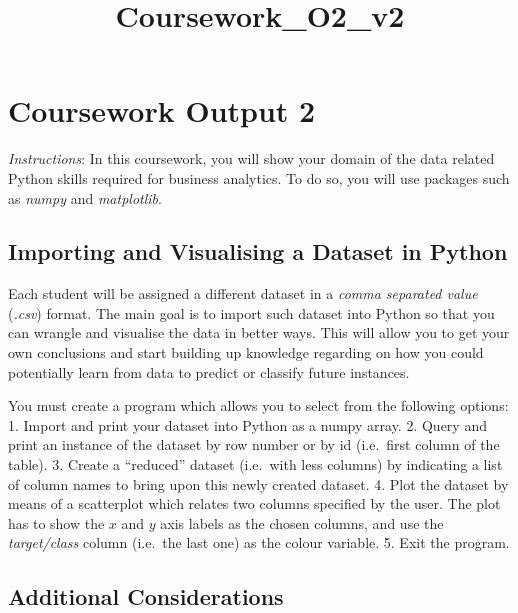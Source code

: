 \documentclass[11pt]{article}
\title{Coursework\_O2\_v2}
\begin{document}
    
    
    \maketitle
    
    

    
    \hypertarget{coursework-output-2}{%
\section{Coursework Output 2}\label{coursework-output-2}}

\emph{Instructions}: In this coursework, you will show your domain of
the data related Python skills required for business analytics. To do
so, you will use packages such as \emph{numpy} and \emph{matplotlib}.

    \hypertarget{importing-and-visualising-a-dataset-in-python}{%
\subsection{Importing and Visualising a Dataset in
Python}\label{importing-and-visualising-a-dataset-in-python}}

Each student will be assigned a different dataset in a \emph{comma
separated value} (\emph{.csv}) format. The main goal is to import such
dataset into Python so that you can wrangle and visualise the data in
better ways. This will allow you to get your own conclusions and start
building up knowledge regarding on how you could potentially learn from
data to predict or classify future instances.

You must create a program which allows you to select from the following
options: 1. Import and print your dataset into Python as a numpy array.
2. Query and print an instance of the dataset by row number or by id
(i.e.~first column of the table). 3. Create a ``reduced'' dataset
(i.e.~with less columns) by indicating a list of column names to bring
upon this newly created dataset. 4. Plot the dataset by means of a
scatterplot which relates two columns specified by the user. The plot
has to show the \(x\) and \(y\) axis labels as the chosen columns, and
use the \emph{target/class} column (i.e.~the last one) as the colour
variable. 5. Exit the program.

    \hypertarget{additional-considerations}{%
\subsection{Additional Considerations}\label{additional-considerations}}
\end{document}
